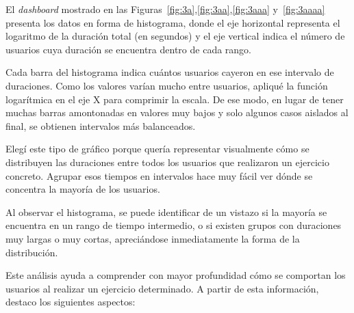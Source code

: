 \documentclass[a4paper, 12pt]{book}
\begin{document}
El \textit{dashboard} mostrado en las Figuras~\ref{fig:3a},\ref{fig:3aa},\ref{fig:3aaa} y~\ref{fig:3aaaa} presenta los datos en forma de histograma, donde el eje horizontal representa el logaritmo de la duración total (en segundos) y el eje vertical indica el número de usuarios cuya duración se encuentra dentro de cada rango.

Cada barra del histograma indica cuántos usuarios cayeron en ese intervalo de duraciones. Como los valores varían mucho entre usuarios, apliqué la función logarítmica en el eje X para comprimir la escala. De ese modo, en lugar de tener muchas barras amontonadas en valores muy bajos y solo algunos casos aislados al final, se obtienen intervalos más balanceados.

Elegí este tipo de gráfico porque quería representar visualmente cómo se distribuyen las duraciones entre todos los usuarios que realizaron un ejercicio concreto. Agrupar esos tiempos en intervalos hace muy fácil ver dónde se concentra la mayoría de los usuarios.

Al observar el histograma, se puede identificar de un vistazo si la mayoría se encuentra en un rango de tiempo intermedio, o si existen grupos con duraciones muy largas o muy cortas, apreciándose inmediatamente la forma de la distribución.

Este análisis ayuda a comprender con mayor profundidad cómo se comportan los usuarios al realizar un ejercicio determinado. A partir de esta información, destaco los siguientes aspectos:
\end{document}
